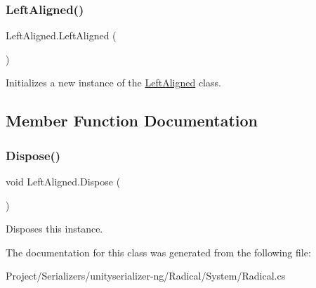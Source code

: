 \subsubsection{\texorpdfstring{Left\+Aligned()}{LeftAligned()}}
{\footnotesize\ttfamily Left\+Aligned.\+Left\+Aligned (\begin{DoxyParamCaption}{ }\end{DoxyParamCaption})\hspace{0.3cm}{\ttfamily [inline]}}



Initializes a new instance of the \hyperlink{class_left_aligned}{Left\+Aligned} class. 



\subsection{Member Function Documentation}
\mbox{\label{class_left_aligned_a1dda8d272d06dc5b2c6678072bb122ab}} 
\subsubsection{\texorpdfstring{Dispose()}{Dispose()}}
{\footnotesize\ttfamily void Left\+Aligned.\+Dispose (\begin{DoxyParamCaption}{ }\end{DoxyParamCaption})\hspace{0.3cm}{\ttfamily [inline]}}



Disposes this instance. 



The documentation for this class was generated from the following file\+:\begin{DoxyCompactItemize}
\item 
Project/\+Serializers/unityserializer-\/ng/\+Radical/\+System/Radical.\+cs\end{DoxyCompactItemize}
